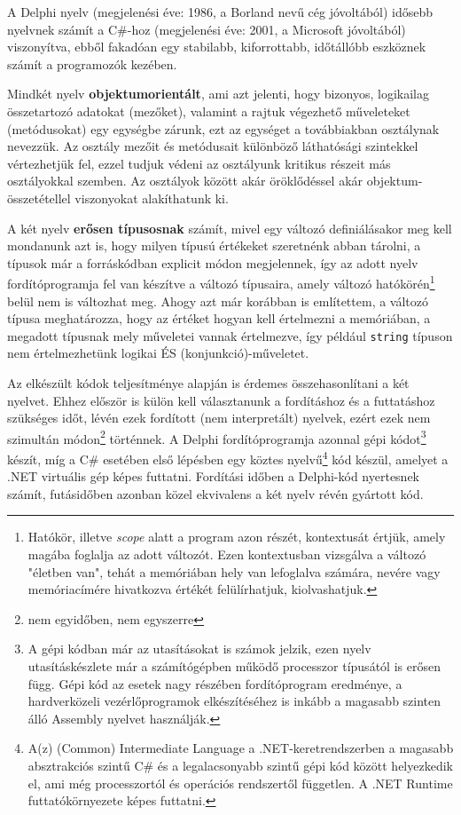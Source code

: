 \documentclass[tocnopagenum]{thesis-ekf}
\theoremstyle{definition}
\theoremstyle{remark}
\begin{document}
	A Delphi nyelv (megjelenési éve: 1986, a Borland nevű cég jóvoltából) idősebb nyelvnek számít a C\#-hoz (megjelenési éve: 2001, a Microsoft 
	jóvoltából) viszonyítva, ebből fakadóan egy stabilabb, kiforrottabb, időtállóbb eszköznek számít a programozók kezében. 
	
	Mindkét nyelv \textbf{objektumorientált}, ami azt jelenti, hogy bizonyos, logikailag összetartozó adatokat (mezőket), valamint a rajtuk végezhető műveleteket (metódusokat) egy egységbe zárunk, ezt az egységet a továbbiakban osztálynak nevezzük. Az osztály mezőit és metódusait különböző láthatósági szintekkel vértezhetjük fel, ezzel tudjuk védeni az osztályunk kritikus részeit más osztályokkal szemben. Az osztályok között akár öröklődéssel akár objektum-összetétellel viszonyokat alakíthatunk ki.
	
	A két nyelv \textbf{erősen típusosnak} számít, mivel egy változó definiálásakor meg kell mondanunk azt is, hogy milyen típusú értékeket szeretnénk abban tárolni, a típusok már a forráskódban explicit módon megjelennek, így az adott nyelv fordítóprogramja fel van készítve a változó típusaira, amely változó hatókörén\footnote{Hatókör, illetve \textit{scope} alatt a program azon részét, kontextusát értjük, amely magába foglalja az adott változót. Ezen kontextusban vizsgálva a változó "életben van", tehát a memóriában hely van lefoglalva számára, nevére vagy memóriacímére hivatkozva értékét felülírhatjuk, kiolvashatjuk.} belül nem is változhat meg. Ahogy azt már korábban is említettem, a változó típusa meghatározza, hogy az értéket hogyan kell értelmezni a memóriában, a megadott típusnak mely műveletei vannak értelmezve, így például \verb|string| típuson nem értelmezhetünk logikai ÉS (konjunkció)-műveletet.
	
	Az elkészült kódok teljesítménye alapján is érdemes összehasonlítani a két nyelvet. Ehhez először is külön kell választanunk a fordításhoz és a futtatáshoz szükséges időt, lévén ezek fordított (nem interpretált) nyelvek, ezért ezek nem szimultán módon\footnote{nem egyidőben, nem egyszerre} történnek. A Delphi fordítóprogramja azonnal gépi kódot\footnote{A gépi kódban már az utasításokat is számok jelzik, ezen nyelv utasításkészlete már a számítógépben működő processzor típusától is erősen függ. Gépi kód az esetek nagy részében fordítóprogram eredménye, a hardverközeli vezérlőprogramok elkészítéséhez is inkább a magasabb szinten álló Assembly nyelvet használják.} készít, míg a C\# esetében első lépésben egy köztes nyelvű\footnote{A(z) (Common) Intermediate Language a .NET-keretrendszerben a magasabb absztrakciós szintű C\# és a legalacsonyabb szintű gépi kód között helyezkedik el, ami még processzortól és operációs rendszertől független. A .NET Runtime futtatókörnyezete képes futtatni.} kód készül, amelyet a .NET virtuális gép képes futtatni. Fordítási időben a Delphi-kód nyertesnek számít, futásidőben azonban közel ekvivalens a két nyelv révén gyártott kód.
	
\end{document}
